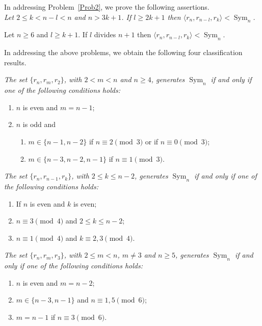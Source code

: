\documentclass[
final
]{dmtcs-episciences}
\DeclareMathOperator{\Sym}{\mathrm{Sym}}
\begin{document}
In addressing Problem~\ref{Prob2}, we prove the following assertions.\\

 {\it  Let $2 \leqslant k < n-l < n$ and $n>3k+1$. If $l \geqslant 2k+1$ then $ \langle r_n, r_{n-l}, r_k\rangle < \Sym_n$.}

\medskip

 {Let $n \geqslant 6$ and $l \geqslant k+1$. If  $l$ divides $n+1$ then   $\langle r_n, r_{n-l},r_k\rangle < \Sym_n$.}

\medskip

In addressing the above problems, we obtain the following four classification results.


\medskip

  {\it The set $\{r_n,r_m,r_2\}$, with $2<m<n$ and $n\geqslant 4$, generates $\Sym_n$ if and only if one of the following conditions holds{\rm:}
\begin{enumerate}[$(i)$]
    \item $n$ is even and $m=n-1${\rm;} 
    \item $n$ is odd and 
    \begin{enumerate}[$(a)$]
        \item $m\in\{n-1,n-2\}$ if $n\equiv2\pmod 3$ or if $n\equiv0\pmod 3${\rm;}
        \item $m\in\{n-3,n-2,n-1\}$ if $n\equiv 1\pmod 3$. 
    \end{enumerate}
\end{enumerate}
}

\medskip

 {\it The set $\{r_n, r_{n-1}, r_k\}$, with $2\leqslant k\leqslant n-2$, generates $\Sym_n$ if and only if one of the following conditions holds:
	\begin{enumerate}[$(i)$]
		\item If $n$ is even and $k$ is even;
		\item $n \equiv 3 \pmod{4}$ and $2\leqslant k\leqslant n-2$;
		\item $n \equiv 1 \pmod{4}$ and $k \equiv 2, 3 \pmod{4}$. 
	\end{enumerate}
}


\medskip

 {\it    The set $\{r_n,r_m,r_3\}$, with $2\leqslant m<n$, $m \not =3$ and $n\geqslant 5$, generates $\Sym_n$ if and only if one of the following conditions holds{\rm:}
    \begin{enumerate}[$(i)$]
        \item $n$ is even and $m=n-2${\rm;}
        \item $m\in\{n-3,n-1\}$ and $n\equiv 1,5\pmod 6${\rm;}
        \item $m=n-1$ if $n\equiv3\pmod 6$.
    \end{enumerate}
}
\end{document}
